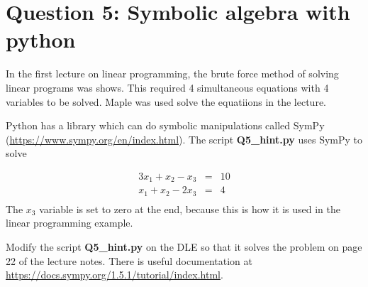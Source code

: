 \section*{Question 5: Symbolic algebra with python}

In the first lecture on linear programming, the brute force
method of solving linear programs was shows. This required
4 simultaneous equations with 4 variables to be solved.
Maple was used solve the equatiions in the lecture. 

Python has a library which can do symbolic 
manipulations called SymPy
(\url{https://www.sympy.org/en/index.html}).
The script \textbf{Q5\_hint.py} uses SymPy to solve

\begin{eqnarray}
3 x_1 + x_2 - x_3 & = & 10 \nonumber \\
x_1 + x_2 - 2x_3 & = & 4 \nonumber \\
\end{eqnarray}
The $x_3$ variable is set to zero at the end, because
this is how it is used in the linear programming example.

Modify the script \textbf{Q5\_hint.py} on the DLE so that 
it solves the problem on page 22 of the lecture notes. 
There is useful documentation at \url{https://docs.sympy.org/1.5.1/tutorial/index.html}.
